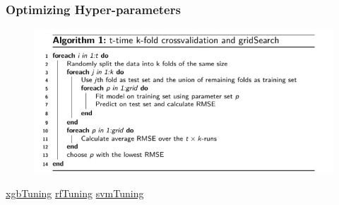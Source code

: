 \documentclass{beamer}
\begin{document}
\begin{frame}[fragile]
\frametitle{Optimizing Hyper-parameters} 

\begin{figure}
	\begin{center}
	\includegraphics[scale=0.43]{Figures/OHP.jpg}
	\end{center}
\end{figure}


\quantnet \href{https://github.com/koehnden/SPL16/tree/master/Quantnet/xgbTuning/}{xgbTuning}
\quantnet \href{https://github.com/koehnden/SPL16/tree/master/Quantnet/rfTuning/}{rfTuning}
\quantnet \href{https://github.com/koehnden/SPL16/tree/master/Quantnet/svmTuning}{svmTuning}
\end{frame}


\end{document}
